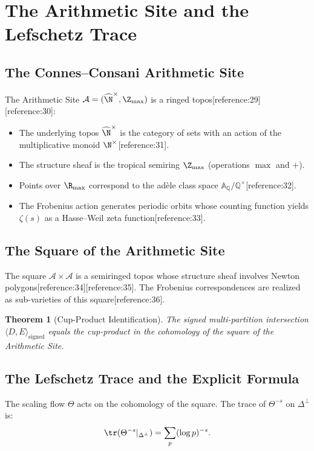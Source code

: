 \documentclass[11pt,a4paper]{article}
\newtheorem{theorem}{Theorem}[section]
\begin{document}
\section{The Arithmetic Site and the Lefschetz Trace}

\subsection{The Connes--Consani Arithmetic Site}

The Arithmetic Site $\mathcal{A} = (\widehat{\N}^{\times}, \Z_{\max})$ is a ringed topos[reference:29][reference:30]:
\begin{itemize}
\item The underlying topos $\widehat{\N}^{\times}$ is the category of sets with an action of the multiplicative monoid $\N^\times$[reference:31].
\item The structure sheaf is the tropical semiring $\Z_{\max}$ (operations $\max$ and $+$).
\item Points over $\R_{\max}$ correspond to the ad\`ele class space $\mathbb{A}_{\mathbb{Q}}/\mathbb{Q}^{\times}$[reference:32].
\item The Frobenius action generates periodic orbits whose counting function yields $\zeta(s)$ as a Hasse--Weil zeta function[reference:33].
\end{itemize}

\subsection{The Square of the Arithmetic Site}

The square $\mathcal{A} \times \mathcal{A}$ is a semiringed topos whose structure sheaf involves Newton polygons[reference:34][reference:35]. The Frobenius correspondences are realized as sub-varieties of this square[reference:36].

\begin{theorem}[Cup-Product Identification]
The signed multi-partition intersection $\langle D, E \rangle_{\text{signed}}$ equals the cup-product in the cohomology of the square of the Arithmetic Site.
\end{theorem}

\subsection{The Lefschetz Trace and the Explicit Formula}

The scaling flow $\Theta$ acts on the cohomology of the square. The trace of $\Theta^{-s}$ on $\Delta^\perp$ is:
\[
\tr(\Theta^{-s} |_{\Delta^\perp}) = \sum_p (\log p)^{-s}.
\]
\end{document}
